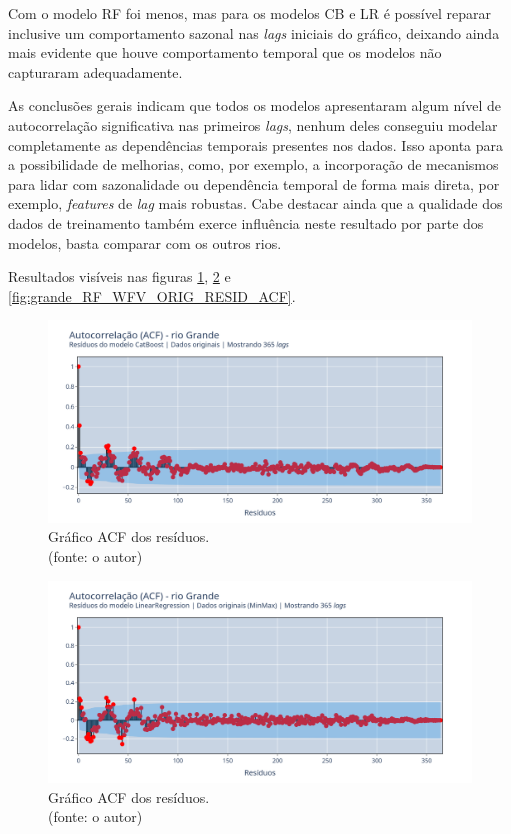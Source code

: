 Com o modelo RF foi menos, mas para os modelos CB e LR é possível reparar inclusive um comportamento sazonal nas \textit{lags} iniciais do gráfico, deixando ainda mais evidente que houve comportamento temporal que os modelos não capturaram adequadamente.

As conclusões gerais indicam que todos os modelos apresentaram algum nível de autocorrelação significativa nas primeiros \textit{lags}, nenhum deles conseguiu modelar completamente as dependências temporais presentes nos dados. Isso aponta para a possibilidade de melhorias, como, por exemplo, a incorporação de mecanismos para lidar com sazonalidade ou dependência temporal de forma mais direta, por exemplo, \textit{features} de \textit{lag} mais robustas. Cabe destacar ainda que a qualidade dos dados de treinamento também exerce influência neste resultado por parte dos modelos, basta comparar com os outros rios.

Resultados visíveis nas figuras \ref{fig:grande_CB_WFV_ORIG_RESID_ACF}, \ref{fig:grande_LR_WFV_ORIG_RESID_ACF} e \ref{fig:grande_RF_WFV_ORIG_RESID_ACF}.

\begin{figure}[!h]
	\centering
	\includegraphics[scale=0.33]{Figuras/rio_grande/wfv/CB/CB_WFV_ORIG_RESID_ACF.png}
	\caption{Gráfico ACF dos resíduos.\\(fonte: o autor)}
	\label{fig:grande_CB_WFV_ORIG_RESID_ACF}
\end{figure}

\begin{figure}[!h]
	\centering
	\includegraphics[scale=0.33]{Figuras/rio_grande/wfv/LR/LR_WFV_ORIG_RESID_ACF.png}
	\caption{Gráfico ACF dos resíduos.\\(fonte: o autor)}
	\label{fig:grande_LR_WFV_ORIG_RESID_ACF}
\end{figure}

